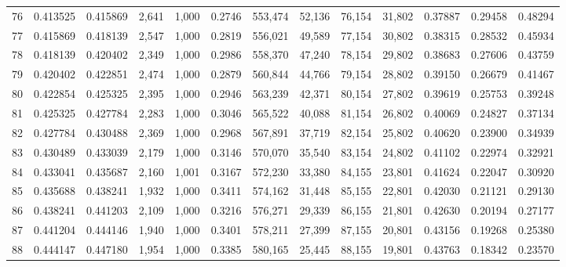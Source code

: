 \begin{tabular}{rrrrrrrrrrrrr}
76  &  0.413525 &  0.415869 &   2,641 &  1,000 &                                     0.2746 &  553,474 &   52,136 &   76,154 &   31,802 &  0.37887 &  0.29458 &  0.48294 \\
77  &  0.415869 &  0.418139 &   2,547 &  1,000 &                                     0.2819 &  556,021 &   49,589 &   77,154 &   30,802 &  0.38315 &  0.28532 &  0.45934 \\
78  &  0.418139 &  0.420402 &   2,349 &  1,000 &                                     0.2986 &  558,370 &   47,240 &   78,154 &   29,802 &  0.38683 &  0.27606 &  0.43759 \\
79  &  0.420402 &  0.422851 &   2,474 &  1,000 &                                     0.2879 &  560,844 &   44,766 &   79,154 &   28,802 &  0.39150 &  0.26679 &  0.41467 \\
80  &  0.422854 &  0.425325 &   2,395 &  1,000 &                                     0.2946 &  563,239 &   42,371 &   80,154 &   27,802 &  0.39619 &  0.25753 &  0.39248 \\
81  &  0.425325 &  0.427784 &   2,283 &  1,000 &                                     0.3046 &  565,522 &   40,088 &   81,154 &   26,802 &  0.40069 &  0.24827 &  0.37134 \\
82  &  0.427784 &  0.430488 &   2,369 &  1,000 &                                     0.2968 &  567,891 &   37,719 &   82,154 &   25,802 &  0.40620 &  0.23900 &  0.34939 \\
83  &  0.430489 &  0.433039 &   2,179 &  1,000 &                                     0.3146 &  570,070 &   35,540 &   83,154 &   24,802 &  0.41102 &  0.22974 &  0.32921 \\
84  &  0.433041 &  0.435687 &   2,160 &  1,001 &                                     0.3167 &  572,230 &   33,380 &   84,155 &   23,801 &  0.41624 &  0.22047 &  0.30920 \\
85  &  0.435688 &  0.438241 &   1,932 &  1,000 &                                     0.3411 &  574,162 &   31,448 &   85,155 &   22,801 &  0.42030 &  0.21121 &  0.29130 \\
86  &  0.438241 &  0.441203 &   2,109 &  1,000 &                                     0.3216 &  576,271 &   29,339 &   86,155 &   21,801 &  0.42630 &  0.20194 &  0.27177 \\
87  &  0.441204 &  0.444146 &   1,940 &  1,000 &                                     0.3401 &  578,211 &   27,399 &   87,155 &   20,801 &  0.43156 &  0.19268 &  0.25380 \\
88  &  0.444147 &  0.447180 &   1,954 &  1,000 &                                     0.3385 &  580,165 &   25,445 &   88,155 &   19,801 &  0.43763 &  0.18342 &  0.23570 \\

\end{tabular}
